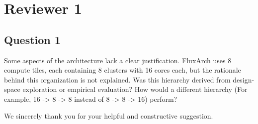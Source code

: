 \section{Reviewer 1}

\subsection{Question 1}
\begin{reviewcomment}
Some aspects of the architecture lack a clear justification. FluxArch uses 8 compute tiles, each containing 8 clusters with 16 cores each, but the rationale behind this organization is not explained. Was this hierarchy derived from design-space exploration or empirical evaluation? How would a different hierarchy (For example, 16 -{}> 8 -{}> 8 instead of 8 -{}> 8 -{}> 16) perform?
\end{reviewcomment}

We sincerely thank you for your helpful and constructive suggestion.


